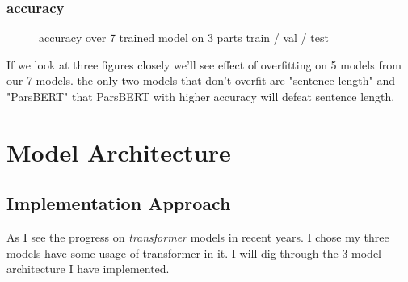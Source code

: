 \documentclass[10pt, a4paper]{article}
\begin{document}
\subsubsection{accuracy}
\begin{figure}[H]
    \centering
    \hfill %
    \hfill
    \caption{accuracy over 7 trained model on 3 parts train / val / test}
\end{figure}

If we look at three figures closely we'll see effect of overfitting on 5 models from our 7 models. the only two models that don't overfit are "sentence length" and "ParsBERT"
that ParsBERT with higher accuracy will defeat sentence length.

\section{Model Architecture}
\subsection{Implementation Approach}
As I see the progress on \textit{transformer} models in recent years. I chose my three models have some usage of transformer in it. I will dig through the 3 model architecture I have implemented.
\end{document}
